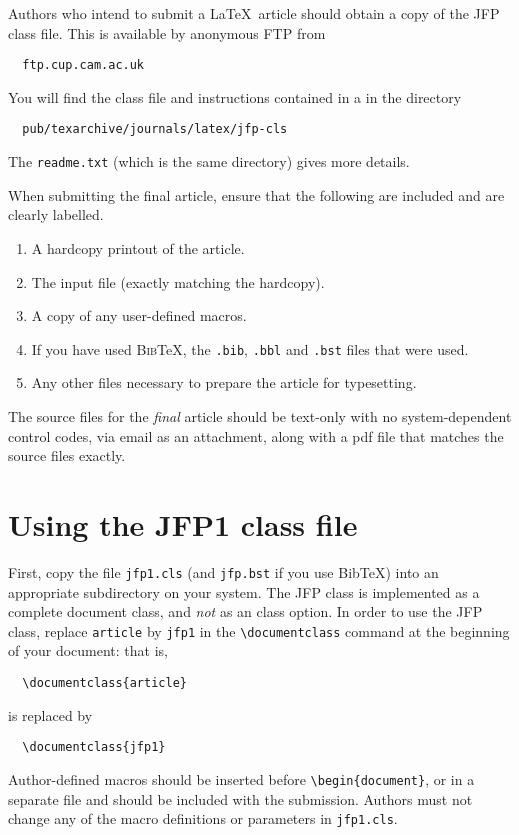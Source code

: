 \documentclass{jfp1}
\begin{document}
Authors who intend to submit a \LaTeX\ article should obtain a copy of the
JFP class file. This is available by anonymous FTP from
%
\begin{verbatim}
  ftp.cup.cam.ac.uk
\end{verbatim}
%
You will find the class file and instructions contained in a
in the directory
%
\begin{verbatim}
  pub/texarchive/journals/latex/jfp-cls
\end{verbatim}
%
The \verb"readme.txt" (which is the same directory) gives more details.

When submitting the final article, ensure that  the following are included and
are clearly labelled.
\begin{enumerate}
  \item A hardcopy printout of the article.
  \item The input file (exactly matching the hardcopy).
  \item A copy of any user-defined macros.
  \item If you have used \textsc{Bib}\TeX, the \verb".bib", \verb".bbl"
        and \verb".bst" files that were used.
  \item Any other files necessary to prepare the article for typesetting.
\end{enumerate}
The source files for the \emph{final} article should be text-only with no
system-dependent control codes, via email as an attachment, along with
a pdf file that matches the source files exactly.

\section{Using the JFP1 class file}
\label{usingjfpclass}

First, copy the file \verb"jfp1.cls" (and \verb"jfp.bst" if you use Bib\TeX)
into an appropriate subdirectory on your system. The JFP class is implemented
as a complete document class, and \emph{not} as an class option.
In order to use the JFP class, replace \verb"article" by \verb"jfp1" in the
\verb"\documentclass" command at the beginning of your document: that is,
%
\begin{verbatim}
  \documentclass{article}
\end{verbatim}
%
is replaced by
%
\begin{verbatim}
  \documentclass{jfp1}
\end{verbatim}
%
Author-defined macros should be inserted before \verb"\begin{document}",
or in a separate file and should be included with the submission.
Authors must not change any of the macro definitions or parameters
in \verb"jfp1.cls".
\end{document}
